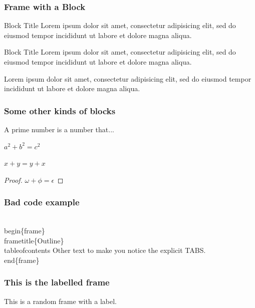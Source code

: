 \documentclass{beamer} %
\begin{document}
\begin{frame}
    \frametitle{Frame with a Block}
    \begin{block}{Block Title}
        Lorem ipsum dolor sit amet, consectetur adipisicing elit, 
        sed do eiusmod tempor incididunt ut labore et 
        dolore magna aliqua.
    \end{block}
    \begin{alertblock}{Block Title}
        Lorem ipsum dolor sit amet, consectetur adipisicing elit, 
        sed do eiusmod tempor incididunt ut labore et 
        dolore magna aliqua.
    \end{alertblock}
    \begin{example}
        Lorem ipsum dolor sit amet, consectetur adipisicing elit, 
        sed do eiusmod tempor incididunt ut labore et
        dolore magna aliqua.
    \end{example}
\end{frame}

\begin{frame}
    \frametitle{Some other kinds of blocks}
    \begin{definition}
        A prime number is a number that...
    \end{definition}
    \begin{theorem}[Pythagoras] 
        $ a^2 + b^2 = c^2$
    \end{theorem}
    \begin{corollary}
        $ x + y = y + x  $
    \end{corollary}
    \begin{proof}
        $\omega +\phi = \epsilon $
    \end{proof}
\end{frame}

\begin{frame}[fragile]
    \frametitle{Bad code example}
    \begin{semiverbatim}
\\begin\{frame\}
    \\frametitle\{Outline\}
    \\tableofcontents
        Other text to make you notice the explicit TABS.
\\end\{frame\}
    \end{semiverbatim}
\end{frame}

\begin{frame}
    \label{FrameToGo}
    \frametitle{This is the labelled frame}
    This is a random frame with a label.
\end{frame}
\end{document}
